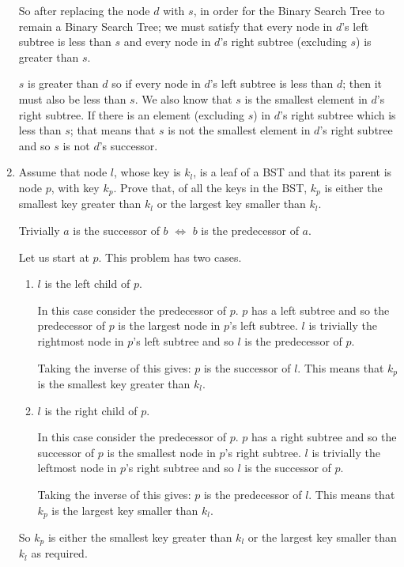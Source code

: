 \documentclass[10pt,\jkfside,a4paper]{article}
\begin{document}
\begin{enumerate}
So after replacing the node $d$ with $s$, in order for the Binary Search Tree to remain a Binary Search Tree; 
we must satisfy that every node in $d$'s left subtree is less than $s$ and 
every node in $d$'s right subtree (excluding $s$) is greater than $s$.

$s$ is greater than $d$ so if every node in $d$'s left subtree is less than $d$; then it must also be less than 
$s$. We also know that $s$ is the smallest element in $d$'s right subtree. If there is an element (excluding $s$) in 
$d$'s right subtree which is less than $s$; that means that $s$ is not the smallest element in $d$'s right subtree and 
so $s$ is not $d$'s successor.

\item Assume that node $l$, whose key is $k_l$, is a leaf of a BST and that its parent is node $p$, with 
key $k_p$. Prove that, of all the keys in the BST, $k_p$ is either the smallest key greater than $k_l$ 
or the largest key smaller than $k_l$.

Trivially $a$ is the successor of $b$ $\Longleftrightarrow$ $b$ is the predecessor of $a$.

Let us start at $p$. This problem has two cases.
\begin{enumerate}

\item $l$ is the left child of $p$.

In this case consider the predecessor of $p$. $p$ has a left subtree and so the predecessor of $p$ is the largest node 
in $p$'s left subtree. $l$ is trivially the rightmost node in $p$'s left subtree and so $l$ is the predecessor of $p$.

Taking the inverse of this gives: $p$ is the successor of $l$.
This means that $k_p$ is the smallest key greater than $k_l$.

\item $l$ is the right child of $p$.

In this case consider the predecessor of $p$. $p$ has a right subtree and so the successor of $p$ is the smallest node in 
$p$'s right subtree. $l$ is trivially the leftmost node in $p$'s right subtree and so $l$ is the successor of $p$.

Taking the inverse of this gives: $p$ is the predecessor of $l$.
This means that $k_p$ is the largest key smaller than $k_l$.

\end{enumerate}

So $k_p$ is either the smallest key greater than $k_l$ 
or the largest key smaller than $k_l$ as required.


\end{enumerate}
\end{document}
